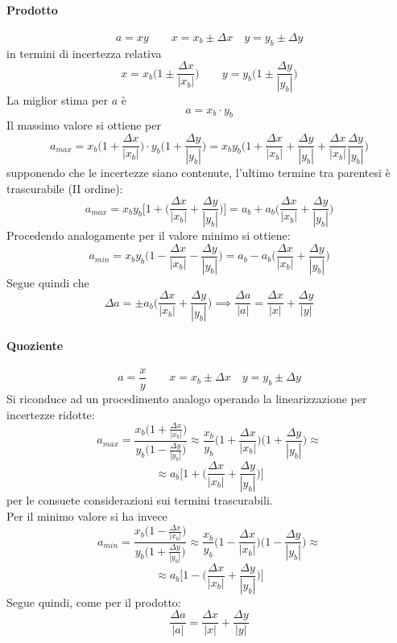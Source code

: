 \documentclass[10pt, oneside]{book}
\begin{document}
\paragraph{Prodotto}
\[a = xy \qquad x = x_b \pm \Delta x \quad y = y_b \pm \Delta y\]
in termini di incertezza relativa
\[x = x_b \bigg(1 \pm \frac{\Delta x}{|x_b|}\bigg) \qquad y = y_b \bigg(1 \pm \frac{\Delta y}{|y_b|}\bigg)\]
La miglior stima per $a$ è 
\[a = x_b \cdot y_b\]
Il massimo valore si ottiene per
\[a_{max} = x_b \bigg(1 + \frac{\Delta x}{|x_b|}\bigg) \cdot y_b  \bigg(1 + \frac{\Delta y}{|y_b|}\bigg) = x_b y_b  \bigg(1 + \frac{\Delta x}{|x_b|} + \frac{\Delta y}{|y_b|} + \frac{\Delta x}{|x_b|}\frac{\Delta y}{|y_b|}\bigg)\]
supponendo che le incertezze siano contenute, l'ultimo termine tra parentesi è trascurabile (II ordine):
\[a_{max} = x_b y_b \bigg[1 + \bigg(\frac{\Delta x}{|x_b|} + \frac{\Delta y}{|y_b|}\bigg)\bigg] = a_b + a_b \bigg(\frac{\Delta x}{|x_b|} + \frac{\Delta y}{|y_b|}\bigg)\]
Procedendo analogamente per il valore minimo si ottiene:
\[a_{min} = x_b y_b \bigg(1 - \frac{\Delta x}{|x_b|} - \frac{\Delta y}{|y_b|}\bigg) = a_b - a_b \bigg(\frac{\Delta x}{|x_b|} + \frac{\Delta y}{|y_b|}\bigg)\]
Segue quindi che
\[\Delta a = \pm a_b \bigg(\frac{\Delta x}{|x_b|} + \frac{\Delta y}{|y_b|}\bigg) \implies \frac{\Delta a}{|a|} = \frac{\Delta x}{|x|} + \frac{\Delta y}{|y|}\]

\paragraph{Quoziente}
\[a = \frac{x}{y} \qquad x = x_b \pm \Delta x \quad y = y_b \pm \Delta y\]
Si riconduce ad un procedimento analogo operando la linearizzazione per incertezze ridotte:
\[a_{max} = \frac{x_b \bigg(1 + \frac{\Delta x}{|x_b|}\bigg)}{y_b \bigg(1 - \frac{\Delta y}{|y_b|}\bigg)} \approx \frac{x_b}{y_b} \bigg(1 + \frac{\Delta x}{|x_b|}\bigg)\bigg(1 + \frac{\Delta y}{|y_b|}\bigg) \approx\]
\[\approx a_b \bigg[1 + \bigg(\frac{\Delta x}{|x_b|} + \frac{\Delta y}{|y_b|}\bigg)\bigg]\]
per le consuete considerazioni sui termini trascurabili.\\
Per il minimo valore si ha invece
\[a_{min} = \frac{x_b \bigg(1 - \frac{\Delta x}{|x_b|}\bigg)}{y_b \bigg(1 + \frac{\Delta y}{|y_b|}\bigg)} \approx \frac{x_b}{y_b} \bigg(1 - \frac{\Delta x}{|x_b|}\bigg)\bigg(1 - \frac{\Delta y}{|y_b|}\bigg) \approx\]
\[\approx a_b \bigg[1 - \bigg(\frac{\Delta x}{|x_b|} + \frac{\Delta y}{|y_b|}\bigg)\bigg]\]
Segue quindi, come per il prodotto:
\[\frac{\Delta a}{|a|} = \frac{\Delta x}{|x|} + \frac{\Delta y}{|y|}\]
\end{document}
